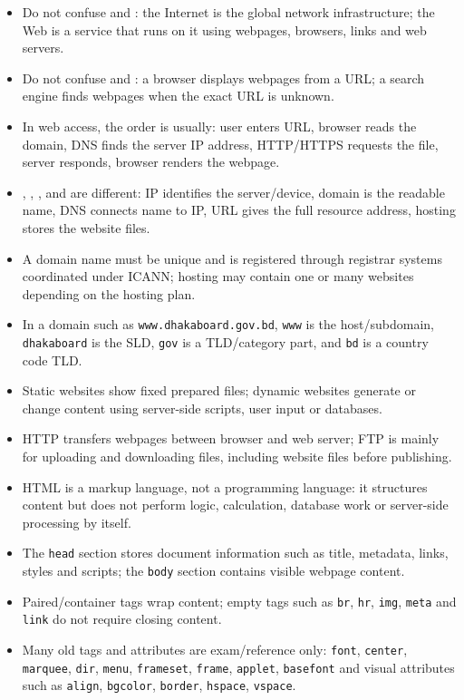 \begin{itemize}
    \item Do not confuse  and : the Internet is the global network infrastructure; the Web is a service that runs on it using webpages, browsers, links and web servers.
    \item Do not confuse  and : a browser displays webpages from a URL; a search engine finds webpages when the exact URL is unknown.
    \item In web access, the order is usually: user enters URL, browser reads the domain, DNS finds the server IP address, HTTP/HTTPS requests the file, server responds, browser renders the webpage.
    \item {}, , ,  and  are different: IP identifies the server/device, domain is the readable name, DNS connects name to IP, URL gives the full resource address, hosting stores the website files.
    \item A domain name must be unique and is registered through registrar systems coordinated under ICANN; hosting may contain one or many websites depending on the hosting plan.
    \item In a domain such as \texttt{www.dhakaboard.gov.bd}, \texttt{www} is the host/subdomain, \texttt{dhakaboard} is the SLD, \texttt{gov} is a TLD/category part, and \texttt{bd} is a country code TLD.
    \item Static websites show fixed prepared files; dynamic websites generate or change content using server-side scripts, user input or databases.
    \item HTTP transfers webpages between browser and web server; FTP is mainly for uploading and downloading files, including website files before publishing.
    \item HTML is a markup language, not a programming language: it structures content but does not perform logic, calculation, database work or server-side processing by itself.
    \item The \texttt{head} section stores document information such as title, metadata, links, styles and scripts; the \texttt{body} section contains visible webpage content.
    \item Paired/container tags wrap content; empty tags such as \texttt{br}, \texttt{hr}, \texttt{img}, \texttt{meta} and \texttt{link} do not require closing content.
    \item Many old tags and attributes are exam/reference only: \texttt{font}, \texttt{center}, \texttt{marquee}, \texttt{dir}, \texttt{menu}, \texttt{frameset}, \texttt{frame}, \texttt{applet}, \texttt{basefont} and visual attributes such as \texttt{align}, \texttt{bgcolor}, \texttt{border}, \texttt{hspace}, \texttt{vspace}.

\end{itemize}
